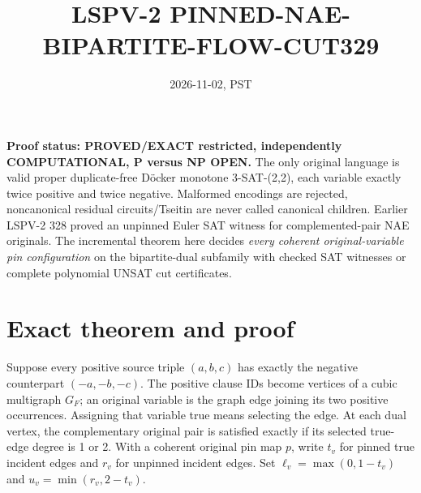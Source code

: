 \documentclass[11pt]{article}
\title{LSPV-2 PINNED-NAE-BIPARTITE-FLOW-CUT329}
\date{2026-11-02, PST}
\begin{document}
\maketitle
\noindent\textbf{Proof status: PROVED/EXACT restricted, independently COMPUTATIONAL, P versus NP OPEN.}
The only original language is valid proper duplicate-free D\"ocker monotone 3-SAT-(2,2), each variable exactly twice positive and twice negative. Malformed encodings are rejected, noncanonical residual circuits/Tseitin are never called canonical children. Earlier LSPV-2 328 proved an unpinned Euler SAT witness for complemented-pair NAE originals. The incremental theorem here decides \emph{every coherent original-variable pin configuration} on the bipartite-dual subfamily with checked SAT witnesses or complete polynomial UNSAT cut certificates.

\section*{Exact theorem and proof}
Suppose every positive source triple $(a,b,c)$ has exactly the negative counterpart $(-a,-b,-c)$. The positive clause IDs become vertices of a cubic multigraph $G_F$; an original variable is the graph edge joining its two positive occurrences. Assigning that variable true means selecting the edge. At each dual vertex, the complementary original pair is satisfied exactly if its selected true-edge degree is 1 or 2. With a coherent original pin map $p$, write $t_v$ for pinned true incident edges and $r_v$ for unpinned incident edges. Set $\ell_v=\max(0,1-t_v)$ and $u_v=\min(r_v,2-t_v)$.
\end{document}
